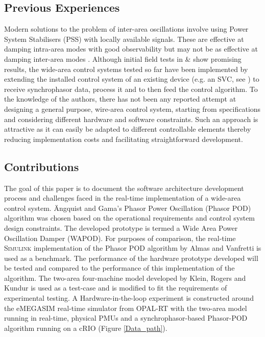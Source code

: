 \documentclass[conference]{IEEEtran}
\begin{document}
\subsection{Previous Experiences}
Modern solutions to the problem of inter-area oscillations involve using Power System Stabilisers (PSS) with locally available signals. These are effective at damping intra-area modes with good observability but may not be as effective at damping inter-area modes \cite{WAPODNorway} \cite{localREMcomparison}. Although initial field tests in \cite{WAPODNorway} \& \cite{WAPODChina} show promising results, the wide-area control systems tested so far have been implemented by extending the installed control system of an existing device (e.g. an SVC, see \cite{WAPODNorway}) to receive synchrophasor data, process it and to then feed the control algorithm. To the knowledge of the authors, there has not been any reported attempt at designing a general purpose, wire-area control system, starting from specifications and considering different hardware and software constraints. Such an approach is attractive as it can easily be adapted to different controllable elements thereby reducing implementation costs and facilitating straightforward development.
\subsection{Contributions}
The goal of this paper is to document the software architecture development process and challenges faced in the real-time implementation of a wide-area control system. \"{A}ngquist and Gama's\cite{PhasorPOD} Phasor Power Oscillation (Phasor POD) algorithm was chosen based on the operational requirements and control system design constraints. The developed prototype is termed a Wide Area Power Oscillation Damper (WAPOD). For purposes of comparison, the real-time \textsc{Simulink} implementation of the Phasor POD algorithm by Almas and Vanfretti \cite{PhasorPODImplement} is used as a benchmark. The performance of the hardware prototype developed will be tested and compared to the performance of this implementation of the algorithm. The two-area four-machine model developed by Klein, Rogers and Kundur \cite{KundurTwoArea} is used as a test-case and is modified to fit the requirements of experimental testing. A Hardware-in-the-loop experiment is constructed around the e\textsc{MEGASIM} real-time simulator from OPAL-RT \cite{OPALemegasim} with the two-area model running in real-time, physical PMUs and a synchrophasor-based Phasor-POD algorithm running on a cRIO (Figure \ref{Data_path}).
\end{document}
